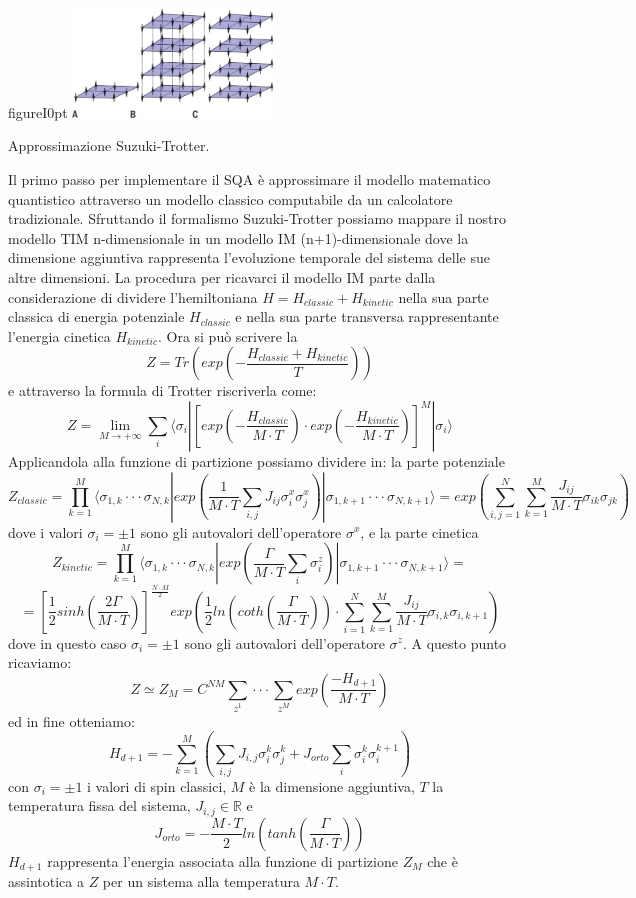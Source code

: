 \begin{wrapfloat}{figure}{I}{0pt}
\includegraphics[width=0.4\textwidth]{Immagini/suzuki.jpg}
\caption{Approssimazione Suzuki-Trotter.}
\label{figura:suzuki}
\end{wrapfloat}
\cite{QA, PIMC, CODE}Il primo passo per implementare il SQA è approssimare il modello matematico quantistico attraverso un modello classico computabile da un calcolatore tradizionale. Sfruttando il formalismo Suzuki-Trotter possiamo mappare il nostro modello TIM n-dimensionale in un modello IM (n+1)-dimensionale dove la dimensione aggiuntiva rappresenta l'evoluzione temporale del sistema delle sue altre dimensioni. La procedura per ricavarci il modello IM parte dalla considerazione di dividere l'hemiltoniana $H = H_{classic} + H_{kinetic}$ nella sua parte classica di energia potenziale $H_{classic}$ e nella sua parte transversa rappresentante l'energia cinetica $H_{kinetic}$. Ora si può scrivere la 
$$Z = Tr (exp(-\frac{H_{classic} + H_{kinetic}}{T}))$$ e attraverso la formula di Trotter riscriverla come:
$$Z= \lim_{M \to +\infty} \sum_i \langle\sigma_i|[exp(-\frac{H_{classic}}{M \cdot T}) \cdot exp(-\frac{H_{kinetic}}{M \cdot T})]^M| \sigma_i\rangle$$
Applicandola alla funzione di partizione possiamo dividere in: la parte potenziale
$$Z_{classic} = \prod^M_{k = 1}\langle\sigma_{1,k}\cdot\cdot\cdot\sigma_{N,k}|exp(\frac{1}{M \cdot T} \sum_{i,j} J_{ij}\sigma^x_i\sigma^x_j)|\sigma_{1,k+1}\cdot\cdot\cdot\sigma_{N,k+1}\rangle = exp(\sum_{i,j=1}^N\sum_{k=1}^M \frac{J_{ij}}{M \cdot T}\sigma_{ik}\sigma_{jk})$$
dove i valori $\sigma_i = \pm 1$ sono gli autovalori dell'operatore $\sigma^x$, e la parte cinetica
$$Z_{kinetic} = \prod^M_{k = 1}\langle\sigma_{1,k}\cdot\cdot\cdot\sigma_{N,k}|exp(\frac{\Gamma}{M \cdot T} \sum_{i}\sigma^z_i)|\sigma_{1,k+1}\cdot\cdot\cdot\sigma_{N,k+1}\rangle =$$
$$= [\frac{1}{2} sinh ( \frac{2\Gamma}{M \cdot T} )]^{\frac{N \cdot M}{2}} exp( \frac{1}{2} ln(coth(\frac{\Gamma}{M \cdot T}))\cdot\sum_{i=1}^N\sum_{k=1}^M \frac{J_{ij}}{M \cdot T}\sigma_{i,k}\sigma_{i,k+1})$$
dove in questo caso $\sigma_i = \pm 1$ sono gli autovalori dell'operatore $\sigma^z$.
A questo punto ricaviamo:
$$ Z \simeq Z_M = C^{NM} \sum_{z^1}\cdot\cdot\cdot\sum_{z^M} exp(\frac{-H_{d+1}}{M\cdot T})$$
ed in fine otteniamo:
$$H_{d+1} = - \sum^M_{k = 1}(\sum_{i,j} J_{i,j} \sigma^k_i \sigma^k_j + J_{orto} \sum_i \sigma^k_i \sigma^{k+1}_i)$$
con  $\sigma_i = \pm 1$ i valori di spin classici, $M$ è la dimensione aggiuntiva, $T$ la temperatura fissa del sistema, $J_{i,j} \in \mathbb{R}$ e
$$J_{orto} = - \frac{M\cdot T}{2} ln(tanh(\frac{\Gamma}{M \cdot T}))$$
$H_{d+1}$ rappresenta l'energia associata alla funzione di partizione $Z_M$ che è assintotica a $Z$ per un sistema alla temperatura $M \cdot T$.

